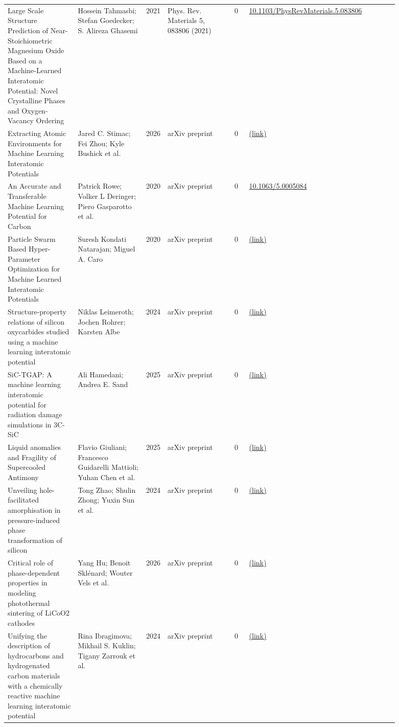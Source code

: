 \documentclass[10pt,a4paper]{article}
\begin{document}
{\begin{longtable}{p{0.192\linewidth}p{0.192\linewidth}p{0.043\linewidth}p{0.192\linewidth}p{0.043\linewidth}p{0.132\linewidth}p{0.096\linewidth}}
Large Scale Structure Prediction of Near-Stoichiometric Magnesium Oxide Based on a Machine-Learned Interatomic Potential: Novel Crystalline Phases and Oxygen-Vacancy Ordering & Hossein Tahmasbi; Stefan Goedecker; S. Alireza Ghasemi & 2021 & Phys. Rev. Materials 5, 083806 (2021) & 0 & \href{https://doi.org/10.1103/PhysRevMaterials.5.083806}{10.1103/PhysRevMaterials.5.083806} &  \\
Extracting Atomic Environments for Machine Learning Interatomic Potentials & Jared C. Stimac; Fei Zhou; Kyle Bushick et al. & 2026 & arXiv preprint & 0 & \href{http://arxiv.org/abs/2607.26018v2}{(link)} &  \\
An Accurate and Transferable Machine Learning Potential for Carbon & Patrick Rowe; Volker L Deringer; Piero Gasparotto et al. & 2020 & arXiv preprint & 0 & \href{https://doi.org/10.1063/5.0005084}{10.1063/5.0005084} &  \\
Particle Swarm Based Hyper-Parameter Optimization for Machine Learned Interatomic Potentials & Suresh Kondati Natarajan; Miguel A. Caro & 2020 & arXiv preprint & 0 & \href{http://arxiv.org/abs/2101.00049v1}{(link)} &  \\
Structure-property relations of silicon oxycarbides studied using a machine learning interatomic potential & Niklas Leimeroth; Jochen Rohrer; Karsten Albe & 2024 & arXiv preprint & 0 & \href{http://arxiv.org/abs/2403.10154v1}{(link)} &  \\
SiC-TGAP: A machine learning interatomic potential for radiation damage simulations in 3C-SiC & Ali Hamedani; Andrea E. Sand & 2025 & arXiv preprint & 0 & \href{http://arxiv.org/abs/2510.06966v1}{(link)} &  \\
Liquid anomalies and Fragility of Supercooled Antimony & Flavio Giuliani; Francesco Guidarelli Mattioli; Yuhan Chen et al. & 2025 & arXiv preprint & 0 & \href{http://arxiv.org/abs/2510.25920v2}{(link)} &  \\
Unveiling hole-facilitated amorphisation in pressure-induced phase transformation of silicon & Tong Zhao; Shulin Zhong; Yuxin Sun et al. & 2024 & arXiv preprint & 0 & \href{http://arxiv.org/abs/2412.04732v1}{(link)} &  \\
Critical role of phase-dependent properties in modeling photothermal sintering of LiCoO2 cathodes & Yang Hu; Benoit Sklénard; Wouter Vels et al. & 2026 & arXiv preprint & 0 & \href{http://arxiv.org/abs/2604.21842v2}{(link)} &  \\
Unifying the description of hydrocarbons and hydrogenated carbon materials with a chemically reactive machine learning interatomic potential & Rina Ibragimova; Mikhail S. Kuklin; Tigany Zarrouk et al. & 2024 & arXiv preprint & 0 & \href{http://arxiv.org/abs/2409.08194v1}{(link)} &  \\

\end{longtable}}
\end{document}
